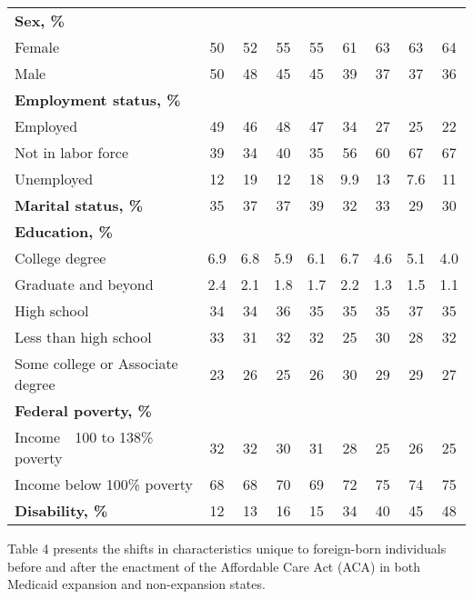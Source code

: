 \documentclass[
]{article}
\let\origtable\table
\let\endorigtable\endtable
\renewenvironment{table}[1][ht]{
      \expandafter\origtable\expandafter[H]
    }{
      \endorigtable
    }
\begin{document}
\begin{table}
\begin{tabular}[t]{lcccccccc}
\textbf{Sex, \%} &  &  &  &  &  &  &  & \\
\hspace{1em}Female & 50 & 52 & 55 & 55 & 61 & 63 & 63 & 64\\
\hspace{1em}Male & 50 & 48 & 45 & 45 & 39 & 37 & 37 & 36\\
\textbf{Employment status, \%} &  &  &  &  &  &  &  & \\
\hspace{1em}Employed & 49 & 46 & 48 & 47 & 34 & 27 & 25 & 22\\
\hspace{1em}Not in labor force & 39 & 34 & 40 & 35 & 56 & 60 & 67 & 67\\
\hspace{1em}Unemployed & 12 & 19 & 12 & 18 & 9.9 & 13 & 7.6 & 11\\
\textbf{Marital status, \%} & 35 & 37 & 37 & 39 & 32 & 33 & 29 & 30\\
\textbf{Education, \%} &  &  &  &  &  &  &  & \\
\hspace{1em}College degree & 6.9 & 6.8 & 5.9 & 6.1 & 6.7 & 4.6 & 5.1 & 4.0\\
\hspace{1em}Graduate and beyond & 2.4 & 2.1 & 1.8 & 1.7 & 2.2 & 1.3 & 1.5 & 1.1\\
\hspace{1em}High school & 34 & 34 & 36 & 35 & 35 & 35 & 37 & 35\\
\hspace{1em}Less than high school & 33 & 31 & 32 & 32 & 25 & 30 & 28 & 32\\
\hspace{1em}Some college or Associate degree & 23 & 26 & 25 & 26 & 30 & 29 & 29 & 27\\
\textbf{Federal poverty, \%} &  &  &  &  &  &  &  & \\
\hspace{1em}Income\ \ 100 to 138\% poverty & 32 & 32 & 30 & 31 & 28 & 25 & 26 & 25\\
\hspace{1em}Income below 100\% poverty & 68 & 68 & 70 & 69 & 72 & 75 & 74 & 75\\
\textbf{Disability, \%} & 12 & 13 & 16 & 15 & 34 & 40 & 45 & 48\\
\bottomrule
\end{tabular}
\end{table}

Table 4 presents the shifts in characteristics unique to foreign-born
individuals before and after the enactment of the Affordable Care Act
(ACA) in both Medicaid expansion and non-expansion states.
\end{document}
